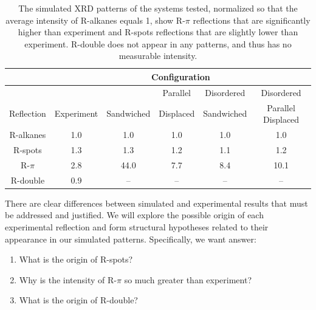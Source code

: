 \documentclass[journal=jpcbfk,manusciprt=article]{achemso}
\begin{document}
  \begin{table}[h]
  \centering
  \begin{tabular}{c|ccccc}
  \toprule
 		   & \multicolumn{5}{c}{Configuration} \\
  \hline
             &            &            & Parallel  & Disordered & Disordered         \\
  Reflection & Experiment & Sandwiched & Displaced & Sandwiched & Parallel Displaced \\
  \midrule
  R-alkanes  & 1.0        &  1.0       &  1.0      & 1.0        & 1.0                \\  
  R-spots    & 1.3        &  1.3       &  1.2      & 1.1        & 1.2                \\
  R-$\pi$    & 2.8        & 44.0       &  7.7      & 8.4        & 10.1               \\
  R-double   & 0.9        &  --        & --        &  --        & --                 \\ 
  \bottomrule
  \end{tabular}
  \caption{The simulated XRD patterns of the systems tested, normalized so that the average 
  intensity of R-alkanes equals 1, show R-$\pi$ reflections that are significantly higher 
  than experiment and R-spots reflections that are slightly lower than experiment. R-double
  does not appear in any patterns, and thus has no measurable intensity.}
  \label{table:relative_inensities_300K} 
  \end{table}
  There are clear differences between simulated and experimental results that must be addressed
  and justified. We will explore the possible origin of each experimental reflection and form 
  structural hypotheses related to their appearance in our simulated patterns. Specifically, we 
  want answer:  
  \begin{enumerate}
	\item What is the origin of R-spots?
  	\item Why is the intensity of R-$\pi$ so much greater than experiment?
  	\item What is the origin of R-double?
  \end{enumerate}
  
\end{document}
